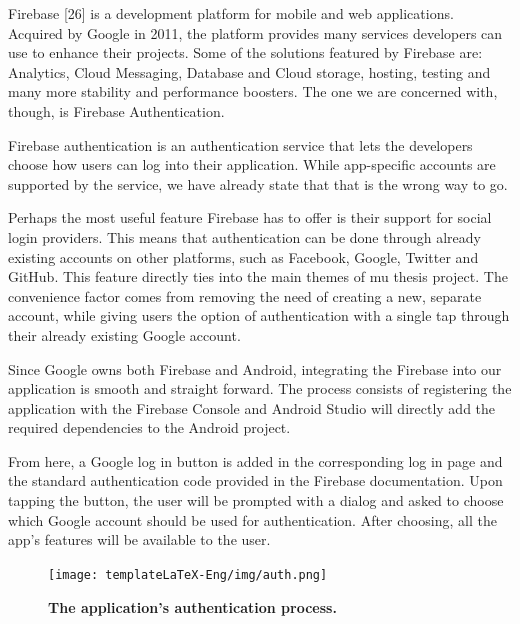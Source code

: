 \documentclass[12pt,a4paper,twoside]{report}
\begin{document}
Firebase [26] is a development platform for mobile and web applications. Acquired by Google in 2011, the platform provides many services developers can use to enhance their projects. Some of the solutions featured by Firebase are: Analytics, Cloud Messaging, Database and Cloud storage, hosting, testing and many more stability and performance boosters. The one we are concerned with, though, is Firebase Authentication. 

Firebase authentication is an authentication service that lets the developers choose how users can log into their application. While app-specific accounts are supported by the service, we have already state that that is the wrong way to go. 

Perhaps the most useful feature Firebase has to offer is their support for social login providers. This means that authentication can be done through already existing accounts on other platforms, such as Facebook, Google, Twitter and GitHub. This feature directly ties into the main themes of mu thesis project. The convenience factor comes from removing the need of creating a new, separate account, while giving users the option of authentication with a single tap through their already existing Google account. 

Since Google owns both Firebase and Android, integrating the Firebase into our application is smooth and straight forward. The process consists of registering the application with the Firebase Console and Android Studio will directly add the required dependencies to the Android project. 

From here, a Google log in button is added in the corresponding log in page and the standard authentication code provided in the Firebase documentation. Upon tapping the button, the user will be prompted with a dialog and asked to choose which Google account should be used for authentication. After choosing, all the app's features will be available to the user.
 \begin{figure}[H]
    \begin{center}
        \texttt{[image: templateLaTeX-Eng/img/auth.png]}
        \caption{\bf The application's authentication process.}
    \end{center}
\end{figure}

\end{document}
